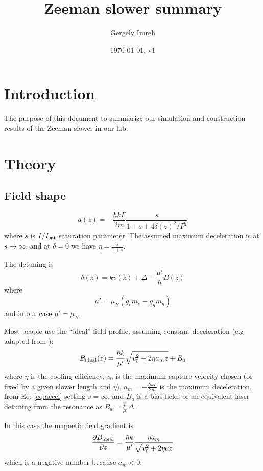 \documentclass[12pt,a4paper]{article}
\author{Gergely Imreh}
\title{Zeeman slower summary}
\date{\today, v1}
\begin{document}
\maketitle

\section{Introduction}

The purpose of this document to summarize our simulation and construction results of the Zeeman slower in our lab.

\section{Theory}

\subsection{Field shape}

\begin{equation}
a(z) = -\frac{\hbar k \Gamma}{2 m} \frac{s}{1 + s + 4 \delta(z)^2 / \Gamma^2}
\label{eq:accel}
\end{equation}
where $s$ is $I/I_{\rm sat}$ saturation parameter. The assumed maximum deceleration is at $s \rightarrow \infty$, and at $\delta = 0$ we have $\eta = \frac{s}{1 + s}$.

The detuning is 
\begin{equation}
\delta(z) = k v(z) + \Delta - \frac{\mu'}{\hbar} B(z)
\end{equation}
where 
\begin{equation}
\mu' = \mu_{B}(g_e m_e - g_g m_g)
\end{equation}
and in our case $\mu' = \mu_{B}$.

Most people use the ``ideal'' field profile, assuming constant deceleration (e.g adapted from \cite{Bell2010}):
\begin{equation}
B_{\rm ideal}(z) = \frac{\hbar k}{\mu'}\sqrt{v_0^2 + 2 \eta a_m z} + B_a
\label{eq:bideal}
\end{equation}
where $\eta$ is the cooling efficiency, $v_0$ is the maximum capture velocity chosen (or fixed by a given slower length and $\eta$), $a_m = -\frac{\hbar k \Gamma}{2 m}$ is the maximum deceleration, from Eq. \ref{eq:accel} setting $s = \infty$, and $B_a$ is a bias field, or an equivalent laser detuning from the resonance as $B_a = \frac{\hbar}{\mu'} \Delta$.

In this case the magnetic field gradient is
\begin{equation}
\frac{\partial B_{\rm ideal}}{\partial z} = \frac{\hbar k}{\mu'} \frac{\eta a_m}{\sqrt{v_0^2 + 2 \eta a z}}
\end{equation}
which is a negative number because $a_m < 0$.
\end{document}
